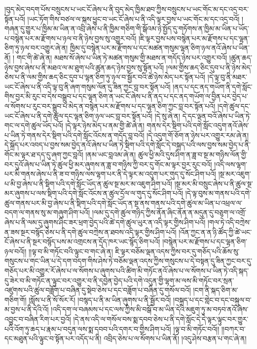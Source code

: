 །བུད་མེད་བདག་པོས་བསྲུངས་པ་ཡང་ངོ་ཞེས་པ་ནི་བུད་མེད་ཁྱིམ་ཐབ་ཀྱིས་བསྲུངས་པ་ཡང་གོང་མ་དང་འདྲ་བར་སྟོན་པའོ། །ཡང་ཏོག་གིས་བཙལ་ལ་སྐས་ཕྱུང་བ་ཡང་ངོ་ཞེས་པ་ནི་འདི་ལྟར་བྱས་པ་ཡང་གོང་མ་དང་འདྲ་བའོ། །གཞན་དུ་གྱུར་པ་ཁྱིམ་མ་ཡིན་ན་འབྲི་ཞེས་པ་ནི་ཁྱིམ་གཅིག་གི་སྒོའམ་ཉེ་སྤྱོད་དུ་གཏོགས་ན་ཁྱིམ་མ་ཡིན་པ་ཡོད་པ་བསྙེན་པར་མ་རྫོགས་པ་ཉལ་བ་ནི་ཉེས་བྱས་སུ་འགྱུར་བའོ། །ཇི་ལྟར་བྱས་པས་བསྙེན་པར་མ་རྫོགས་པ་དང་ལྷན་ཅིག་ཏུ་ཉལ་བར་འགྱུར་ཞེ་ན། ཁྱིམ་དུ་བསྙེན་པར་མ་རྫོགས་པ་དང་མཚན་གསུམ་ལྷན་ཅིག་ཉལ་ནའོ་ཞེས་པ་ཡིན་ནོ། །
གང་གི་ཚེ་ཞེ་ན། མཐས་སོ་ཞེས་པ་ཡིན་ཏེ་མཚན་གསུམ་གྱི་མཐས་ན་གདོད་ཉེས་པར་འགྱུར་བའོ། །ཚུན་ཆད་ཉེས་བྱས་ཞེས་པ་ནི་མཐའ་ལ་མ་ཐུག་པའི་ཚུན་ཆད་ཉེས་བྱས་སུ་སྟོན་པའོ། །ལམ་གྱིས་ཆད་ཅིང་དུབ་པ་ནི་ཉེས་མེད་ཅེས་པ་ནི་ལམ་གྱིས་ཆད་ཅིང་དུབ་པ་ལྷན་ཅིག་ཏུ་ཉལ་བ་སྦྱོར་བའི་ཚེ་ཉེས་མེད་པར་སྟོན་པའོ། །དེ་ལྟ་བུ་ནི་མཐར་ཡང་ངོ་ཞེས་པ་ནི་འདི་ལྟ་བུ་ནི་ཞག་གསུམ་ལོན་དུ་ཟིན་ཀྱང་བླ་བར་སྟོན་པའོ། །ནད་པ་དང་ནད་གཡོག་ནི་དགེ་སློང་གིས་བྱར་མི་རུང་བ་དེས་བསྒྲུབ་པ་དང་ལྷན་ཅིག་ན་ཡང་ངོ་ཞེས་པ་ནི་ནད་པ་དང་ནད་གཡོག་ལ་བྱིན་པར་བྱེད་པ་ལ་སོགས་པ་རུང་བར་སྒྲུབ་པ་མེད་ན་བསྙེན་པར་མ་རྫོགས་པ་དང་ལྷན་ཅིག་ཀྱང་བླ་བར་སྟོན་པའོ། །དགེ་ཚུལ་དང་ཡང་ངོ་ཞེས་པ་ནི་དགེ་ཚུལ་དང་ལྷན་ཅིག་ཉལ་ཡང་བླ་བར་སྟོན་པའོ། །དེ་སུ་ཞེ་ན། དེ་དང་ལྡན་བའོ་ཞེས་པ་ཡིན་ཏེ་གང་ལ་དགེ་ཚུལ་ཡོད་པའོ། །དེ་ལྟར་ཉེས་མེད་པ་ནམ་གྱི་ཚེ་ཞེ་ན། གནས་དེར་སྡིག་པའི་དགེ་སློང་འདུག་ནའོ་ཞེས་པ་ཡིན་ཏེ་གནས་དེར་སྡིག་པའི་དགེ་སློང་འོངས་ན་གདོད་བླ་བའོ། །དེ་འདུག་གོ་ཅོག་ན་ཉེས་པར་འགྱུར་རམ་ཞེ་ན། དེ་སྐྲོད་པར་འབད་པ་བྱས་སམ་བྱེད་ནའོ་ཞེས་པ་ཡིན་ཏེ་སྡིག་པའི་དགེ་སློང་དེ་བསྐྲད་པའི་ལས་བྱས་སམ་བྱེད་པ་ནི་གོང་མ་ལྟར་ཐ་དད་དུ་ཞག་ཀྱང་བླའོ། །ནམ་ཡང་བླའམ་ཞེ་ན། ཚུལ་ཕྱི་མའི་དུས་ཤིག་ན་ཟླ་བ་སྔ་མ་གཉིས་ལོན་གྱི་བར་དུའོ་ཞེས་པ་ཡིན་ཏེ་ཚུལ་ཕྱི་མར་ཞུགས་ན་ཟླ་བ་གཉིས་ཀྱི་བར་དུ་གོང་མ་ལྟར་བྱར་རུང་བའོ། །འདི་ལས་ལྷག་པར་མི་གནས་ཞེས་པ་ནི་ཟ་བ་གཉིས་ལས་ལྷག་པར་ནི་དེ་ལྟར་མ་འདུག་པར་གུད་དུ་སོང་ཤིག་པའོ། །སྔ་མར་འཇུག་པ་མི་བྱ་ཞེས་པ་ནི་སྡིག་པའི་དགེ་སློང་ཡོད་ན་ཚུལ་སྔ་མར་མ་འཇུག་ཤིག་པའོ། །སྔ་མར་མི་བསྲུང་ཞེས་པ་ནི་ཚུལ་སྔ་མར་ཞུགས་པ་ལས་སྡིག་པའི་དགེ་སློང་འོངས་ན་ཚུལ་དྲོལ་ལ་གུད་དུ་སོང་ཤིག་པའོ། །དེ་ལྟ་བུས་མ་གནས་པའི་དགེ་ཚུལ་གནས་པར་མི་བྱ་ཞེས་པ་ནི་སྡིག་པའི་དགེ་སློང་ཡོད་ན་སྔ་ནས་གནས་པའི་དགེ་ཚུལ་མ་ཡིན་པ་འཕྲལ་ལ་བདག་ལ་གནས་སུ་མ་གཞུག་ཤིག་པའོ། །ལམ་དུ་དགེ་ཚུལ་གཉིད་ཀྱིས་ནོན་ཞིང་ནོན་ན་མདུན་དུ་བཅུག་ལ་འགྲོ་ཞེས་པ་ནི་ལམ་དུ་ཞུགས་ཤིང་ཟར་ཕྲག་བྱེད་པའི་ཚེ་དགེ་ཚུལ་ཡུར་ན་འདི་ལྟར་གྱིས་ཤིག་པའོ། །གལ་ཏེ་འདི་བཀྲེས་ན་ཟས་སྔར་བསྙོད་ཅེས་པ་ནི་དགེ་ཚུལ་བཀྲེས་ན་ཐབས་འདི་ལྟར་གྱིས་ཤིག་པའོ། །འོན་ཀྱང་ན་ན་ཉི་ཚོད་ཀྱི་ཚེ་ཡང་ངོ་ཞེས་པ་ནི་སྔར་བསྙོད་པས་མ་འགྲངས་ན་དྲོད་ཁར་ཡང་སྙོད་ཅིག་པའོ། །བསྙེན་པར་མ་རྫོགས་པ་དང་ལྷན་ཅིག་ཉལ་བའོ།། །།ལྟ་བ་མི་གཏོང་བའི་ལྟུང་བ་གང་ཞེ་ན། ཇི་ལྟར་བཅོམ་ལྡན་འདས་ཀྱིས་བར་དུ་གཅོད་པའི་ཆོས་སུ་གསུངས་པ་གང་ཡིན་པ་དེ་དག་བདག་གིས་ཤེས་ཏེ་བཅོམ་ལྡན་འདས་ཀྱིས་གསུངས་པ་དེ་བསྟན་དུ་ཟིན་ཀྱང་བར་དུ་གཅོད་པར་མི་འགྱུར་རོ་ཞེས་པ་ལ་སོགས་པ་ཞུགས་པའི་ཚིག་མི་གཏོང་ནའོ་ཞེས་པ་ལ་སོགས་པ་ཡིན་ཏེ་འདི་སྐད་དུ་ཟེར་བ་མི་གཏོང་ན་ལྟུང་བར་འགྱུར་བ་ནི་དབྱེན་བྱེད་པའི་དགེ་འདུན་གྱི་ལྷག་མ་ལས་མི་གཏོང་བར་སྲན་འཛུགས་པའི་ཚུལ་བཟློག་པ་བཞིན་དུ་སྡེབ་ཅེས་པ་དང་བཟློག་པ་བཞིན་དུ་གསོལ་བའོ། །ངག་ནི་སྐད་ཅིག་མ་གཅིག་གོ། །སློས་པ་ནི་སོ་སོར་རོ། །བསྙད་པ་ནི་མ་ཡིན་ཞུགས་པ་ནི་སྦྱོར་བའོ། །བསྐྲད་པ་དང་གླེང་བ་དང་བསྐུལ་བ་མ་བྱས་པ་ནི་དེའི་འོ། །འདི་དག་ལ་བཞམས་པ་དང་ལས་ཀྱིས་མི་བསྒོ་བ་མ་ཡིན་དེའི་མཇུག་ཏུ་མ་བཏབ་ནའོ་ཞེས་འབྱུང་བ་བཞིན་རིག་པར་བྱའོ། །དེ་ནས་འདི་ལ་གསོལ་བས་སྨ་དབབ་ཅེས་པ་ནི་དགེ་སློང་དེ་དེ་ལྟར་ལྟུང་བར་གྱུར་པའི་འོག་ཏུ་ཆད་པ་རྣམ་པ་བདུན་ལས་སྨ་དབབ་པའི་དགར་བ་གྱིས་ཤིག་པའོ། །ལྟ་བ་མི་གཏོང་བའོ།། །།བཀར་བ་དང་མཐུན་པའི་ལྟུང་བ་སྟོན་པར་འདོད་པ་ནི། འབྲིད་ཅེས་པ་ལ་སོགས་པ་ཡིན་ནོ། །འདུ་ཤེས་བརྩན་པ་གང་ཞེ་ན། 